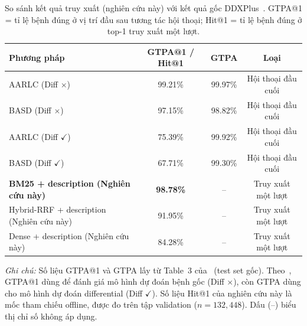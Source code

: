 \begin{table}[H]
  \centering
  \begin{threeparttable}
    \caption{So sánh kết quả truy xuất (nghiên cứu này) với kết quả gốc DDXPlus~\cite{ddxplus2022}. GTPA@1 = tỉ lệ bệnh đúng ở vị trí đầu sau tương tác hội thoại; Hit@1 = tỉ lệ bệnh đúng ở top-1 truy xuất một lượt.}
    \label{tab:sosanh_ddxplus}
    \small
    \begin{tabular}{lccc}
      \toprule
      \textbf{Phương pháp}                         & \textbf{GTPA@1 / Hit@1} & \textbf{GTPA} & \textbf{Loại}      \\
      \midrule
      AARLC (Diff $\times$)~\cite{ddxplus2022}     & 99.21\%                 & 99.97\%       & Hội thoại đầu cuối \\
      BASD (Diff $\times$)~\cite{ddxplus2022}      & 97.15\%                 & 98.82\%       & Hội thoại đầu cuối \\
      AARLC (Diff $\checkmark$)~\cite{ddxplus2022} & 75.39\%                 & 99.92\%       & Hội thoại đầu cuối \\
      BASD (Diff $\checkmark$)~\cite{ddxplus2022}  & 67.71\%                 & 99.30\%       & Hội thoại đầu cuối \\
      \midrule
      \textbf{BM25 + description (Nghiên cứu này)} & \textbf{98.78\%}        & --            & Truy xuất một lượt \\
      Hybrid-RRF + description (Nghiên cứu này)    & 91.95\%                 & --            & Truy xuất một lượt \\
      Dense + description (Nghiên cứu này)         & 84.28\%                 & --            & Truy xuất một lượt \\
      \bottomrule
    \end{tabular}
    \begin{tablenotes}[flushleft]
      \footnotesize
      \item \textit{Ghi chú:} Số liệu GTPA@1 và GTPA lấy từ Table~3 của~\cite{ddxplus2022} (test set gốc). Theo~\cite{ddxplus2022}, GTPA@1 dùng để đánh giá mô hình dự đoán bệnh gốc (Diff $\times$), còn GTPA dùng cho mô hình dự đoán differential (Diff $\checkmark$). Số liệu Hit@1 của nghiên cứu này là mốc tham chiếu offline, được đo trên tập validation ($n = 132{,}448$). Dấu (--) biểu thị chỉ số không áp dụng.
    \end{tablenotes}
  \end{threeparttable}
\end{table}

